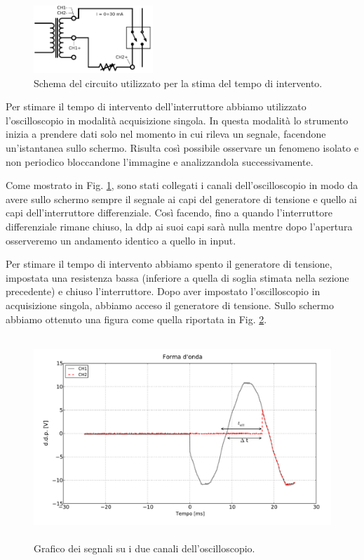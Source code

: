 \begin{figure}
	\centering
    \includegraphics[width=0.40\textwidth]{time.pdf}
    \caption{Schema del circuito utilizzato per la stima del tempo di intervento.}
    \label{fig:time}
\end{figure}

Per stimare il tempo di intervento dell'interruttore abbiamo utilizzato l'oscilloscopio in modalità acquisizione singola. In questa modalità lo strumento inizia a prendere dati solo nel momento in cui rileva un segnale, facendone un'istantanea sullo schermo. Risulta così possibile osservare un fenomeno isolato e non periodico bloccandone l'immagine e analizzandola successivamente.

Come mostrato in Fig. \ref{fig:time}, sono stati collegati i canali dell'oscilloscopio in modo da avere sullo schermo sempre il segnale ai capi del generatore di tensione e quello ai capi dell'interruttore differenziale. Così facendo, fino a quando l'interruttore differenziale rimane chiuso, la ddp ai suoi capi sarà nulla mentre dopo l'apertura osserveremo un andamento identico a quello in input.

Per stimare il tempo di intervento abbiamo spento il generatore di tensione, impostata una resistenza bassa (inferiore a quella di soglia stimata nella sezione precedente) e chiuso l'interruttore. Dopo aver impostato l'oscilloscopio in acquisizione singola, abbiamo acceso il generatore di tensione. Sullo schermo abbiamo ottenuto una figura come quella riportata in Fig. \ref{fig:graph}.

\begin{figure}[h]
	\centering
    \includegraphics[height=3in]{graph.pdf}
    \caption{Grafico dei segnali su i due canali dell'oscilloscopio.}
    \label{fig:graph}
\end{figure}


